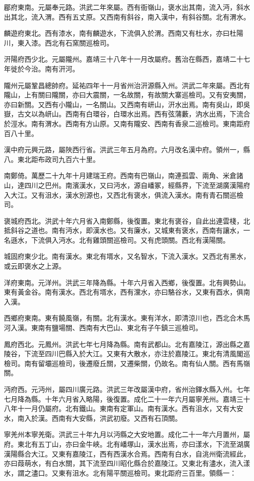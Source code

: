 郿府東南。元屬奉元路。洪武二年來屬。西有衙嶺山，褒水出其南，流入沔，斜水出其北，流入渭。西有五丈原。又西南有斜谷，南入漢中，有斜谷關。北有渭水。

麟遊府東北。西有漆水，南有麟遊水，下流俱入於渭。西南又有杜水，亦曰杜陽川，東入漆。西北有石窯關巡檢司。

汧陽府西少北。元屬隴州。嘉靖三十八年十一月改屬府。舊治在縣西，嘉靖二十七年徙於今治。南有汧河。

隴州元屬鞏昌總帥府。延祐四年十一月省州治汧源縣入州。洪武二年來屬。西北有隴山，上有關曰隴關，亦曰大震關，一名故關，有故關大寨巡檢司。又有安夷關，亦曰新關。又西有小隴山，一名關山。又西南有岍山，汧水出焉。南有吳山，即吳嶽，古文以為岍山。西南有白環谷，白環水出焉。西有弦蒲藪，汭水出焉，下流合於涇水。南有渭水。西南有方山原。又南有隴安、西南有香泉二巡檢司。東南距府百八十里。

漢中府元興元路，屬陜西行省。洪武三年五月為府。六月改名漢中府。領州一，縣八。東北距布政司九百六十里。

南鄭倚。萬歷二十九年十月建瑞王府。西南有巴嶺山，南連孤雲、兩角、米倉諸山，達四川之巴州。南濱漢水，又曰沔水，源自嶓冢，經縣界，下流至湖廣漢陽府入大江。又有沮水，漢水別源也，又西北有褒水，俱流入漢水。南有青石關巡檢司。

褒城府西北。洪武十年六月省入南鄭縣，後復置。東北有褒谷，自此出連雲棧，北抵斜谷之道也。南有沔水，即漢水也。又有廉水，又城東有褒水，西南有讓水，一名遜水，下流俱入沔水。北有雞頭關巡檢司。又有虎頭關。西北有漢陽關。

城固府東少北。南有漢水。東北有壻水，又名智水，下流入漢水。又西北有黑水，或云即褒水之上源。

洋府東南。元洋州。洪武三年降為縣。十年六月省入西鄉，後復置。北有興勢山。東有黃金谷。南有漢水。西北有壻水，西有灙水，亦曰駱谷水，又東有酉水，俱南入漢。

西鄉府東南。東有饒風嶺，有關。北有漢水。東有洋水，即清涼川也，西北合木馬河入漢。東南有鹽場關、西南有大巴山、東北有子午鎮三巡檢司。

鳳府西北。元鳳州。洪武七年七月降為縣。南有武都山。北有嘉陵江，源出縣之嘉陵谷，下流至四川巴縣入於大江。又東有大散水，亦注於嘉陵江。東北有清風閣巡檢司。南有留壩巡檢司，後遷廢丘關，又遷柴關，仍故名。南有仙人關。西有馬嶺關。

沔府西。元沔州，屬四川廣元路。洪武三年改屬漢中府，省州治鐸水縣入州。七年七月降為縣。十年六月省入略陽，後復置。成化二十一年六月屬寧羌州。嘉靖三十八年十一月仍屬府。北有鐵山。東南有定軍山。南有漢水。西有沮水，又有大安水，南入於漢。西南有大安縣，洪武初廢。又西有石頂關。

寧羌州本寧羌衛。洪武三十年九月以沔縣之大安地置。成化二十一年六月置州，屬府。東北有五丁山，亦曰金牛峽。北有嶓塚山，漢水出焉，亦曰漾水，下流至湖廣漢陽縣合大江。又東有嘉陵江，西有西漢水合焉。西南有白水，自洮州衛流經此，亦曰葭萌水，有白水關，其下流至四川昭化縣合於嘉陵江。又東北有濜水，流入漾水，謂之濜口。又東有沮水。北有陽平關巡檢司。東北距府三百里。領縣一：

